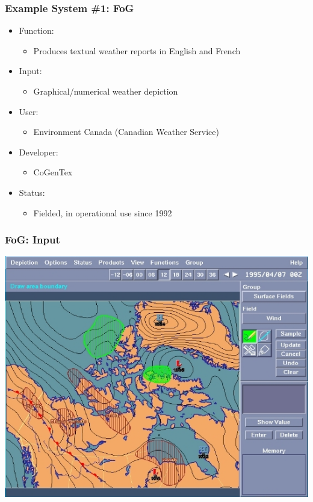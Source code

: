 \documentclass[compress,color=usenames]{beamer}
\begin{document}
\begin{frame}
\frametitle{Example System \#1: FoG}

\label{f16}
\begin{itemize}
\item { {Function: }}
\begin{itemize}
\item Produces textual weather reports in English and French 
\end{itemize}
\item { {Input: }}
\begin{itemize}
\item Graphical/numerical weather depiction
\end{itemize}
\item { {User: }}
\begin{itemize}
\item Environment Canada (Canadian Weather Service)
\end{itemize}
\item { {Developer: }}
\begin{itemize}
\item CoGenTex
\end{itemize}
\item { {Status: }}
\begin{itemize}
\item Fielded, in operational use since 1992
\end{itemize}
\end{itemize}
\end{frame}

\begin{frame}
\frametitle{FoG: Input}

\begin{center}
\includegraphics[scale=.4]{pics/pic2.jpg}
\end{center}

\end{frame}
\end{document}
